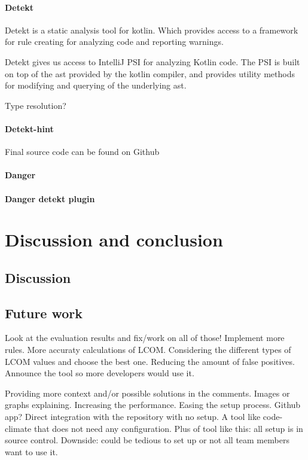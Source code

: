 \documentclass{report}
\begin{document}
\subsubsection{Detekt}
Detekt is a static analysis tool for kotlin. Which provides access to a framework for rule creating for analyzing code and reporting warnings.

Detekt gives us access to IntelliJ PSI for analyzing Kotlin code. The PSI is built on top of the \gls{ast} provided by the kotlin compiler, and provides utility methods for modifying and querying of the underlying \gls{ast}.

Type resolution?

\subsubsection{Detekt-hint}
Final source code can be found on Github\cite{detekt-hint-repository}

\subsubsection{Danger}

\subsubsection{Danger detekt plugin}

\chapter{Discussion and conclusion}
\label{discussion}

\section{Discussion}

\section{Future work}
Look at the evaluation results and fix/work on all of those! 
Implement more rules. More accuraty calculations of LCOM. Considering the different types of LCOM values and choose the best one.
Reducing the amount of false positives.
Announce the tool so more developers would use it.

Providing more context and/or possible solutions in the comments. Images or graphs explaining.
Increasing the performance.
Easing the setup process. Github app? Direct integration with the repository with no setup. A tool like code-climate that does not need any configuration. Plus of tool like this: all setup is in source control. Downside: could be tedious to set up or not all team members want to use it.
\end{document}

